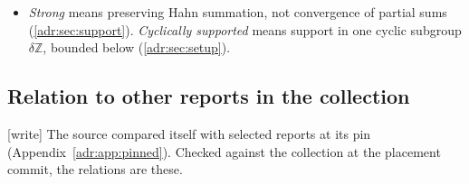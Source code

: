 \documentclass[11pt,letterpaper]{article}
\numberwithin{equation}{section}
\theoremstyle{definition}
\theoremstyle{remark}
\newcommand{\Z}{\mathbb Z}
\newcommand{\wtag}{\textup{[write]}}%
\begin{document}
\begin{itemize}[leftmargin=*,itemsep=3pt]
\cref{adr:thm:finite-polynomials,adr:thm:decidable}. $D$ is an integer
degree in \cref{adr:lem:puiseux,adr:thm:collapse,adr:thm:degree,adr:thm:finite-polynomials,adr:thm:decidable}
and an auxiliary series in the proof of \cref{adr:lem:bottcher}; it never
denotes a derivation. $H_a$ is the normalized inverse B\"ottcher
coordinate of \cref{adr:prop:germ}, an ordinary power series; it is not
the convex subgroup $H_\alpha$ of the notation guide. $L$ is a series in
\cref{adr:lem:bottcher} and in Appendix~\ref{adr:app:checks}, and a field in
\cref{adr:cor:coefficients,adr:thm:degree}. $T$ is a monomial variable,
$t^{-\delta}$ or $\omega^\delta$, or an ordinary polynomial variable, and
$T_j=\omega^{g_j}$ in \cref{adr:thm:all-orders}.
\item \emph{Strong} means preserving Hahn summation, not convergence of
partial sums (\cref{adr:sec:support}). \emph{Cyclically supported} means
support in one cyclic subgroup $\delta\Z$, bounded below
(\cref{adr:sec:setup}).
\end{itemize}

\subsection{Relation to other reports in the collection}
\label{adr:sec:collection}

\wtag{} The source compared itself with selected reports at its pin
(Appendix~\ref{adr:app:pinned}). Checked against the collection at the placement
commit, the relations are these.
\end{document}
